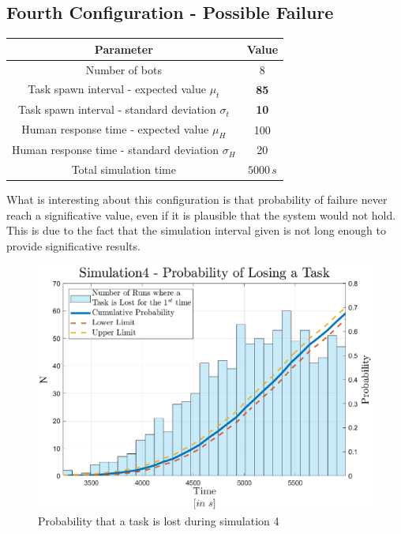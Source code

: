 \documentclass{article}
\begin{document}
		\subsection{Fourth Configuration - Possible Failure}
			\begin{center}
				\begin{tabular}{ |c|c|}
					\hline
					Parameter & Value\\
					\hline
					\hline
					Number of bots & 8\\
					\hline
					Task spawn interval - expected value $\mu_t$ & \textbf{85}\\
					\hline					
					Task spawn interval - standard deviation $\sigma_t$ & \textbf{10}\\
					\hline
					Human response time - expected value $\mu_H$ & 100\\
					\hline					
					Human response time - standard deviation $\sigma_H$ & 20\\
					\hline
					Total simulation time & $5000\,s$\\
					\hline
				\end{tabular}
			\end{center}
			What is interesting about this configuration is that probability of failure never reach a significative value, even if it is plausible that the system would not hold. This is due to the fact that the simulation interval given is not long enough to provide significative results.
			\begin{figure}[H]
				\centering
					\includegraphics[scale = 0.6]{Images/Simulation4}
					\caption{Probability that a task is lost during simulation 4}
					\label{fig:sim4}
			\end{figure}
	
\end{document}
